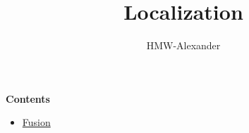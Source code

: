 \documentclass[letterpaper,11pt]{article}
\title{\textbf{Localization}}
\author{HMW-Alexander}
\begin{document}
\maketitle

\textbf{Contents}
\begin{itemize}
	\item \href{./Fusion/index.html}{Fusion}
\end{itemize}
	
\end{document}
